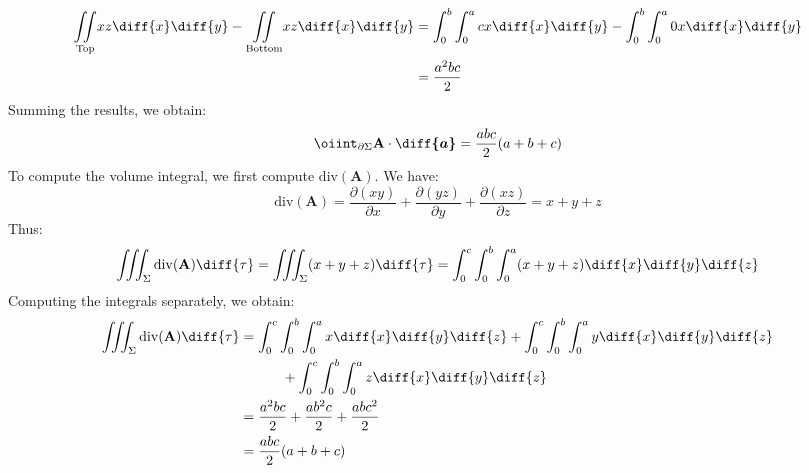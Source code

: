 \begin{solution}
\begin{subequations}
\begin{align}
                        \underset{\textrm{Top}}{\iint}
                            xz\diff{x}\diff{y}-
                        \underset{\textrm{Bottom}}{\iint}
                            xz\diff{x}\diff{y}
                        &=\int_{0}^{b}\int_{0}^{a}cx\diff{x}\diff{y}-
                          \int_{0}^{b}\int_{0}^{a}0x\diff{x}\diff{y}\\
                        &=\frac{a^{2}bc}{2}
                    \end{align}
                \end{subequations}
                Summing the results, we obtain:
                \begin{equation}
                    \oiint_{\partial\Sigma}
                        \mathbf{A}\cdot\boldsymbol{\diff{a}}
                    =\frac{abc}{2}(a+b+c)
                \end{equation}
                To compute the volume integral, we first compute
                $\mathrm{div}(\mathbf{A})$. We have:
                \begin{equation}
                    \mathrm{div}(\mathbf{A})
                    =\frac{\partial(xy)}{\partial{x}}
                    +\frac{\partial(yz)}{\partial{y}}
                    +\frac{\partial(xz)}{\partial{z}}
                    =x+y+z
                \end{equation}
                Thus:
                \begin{equation}
                    \iiint_{\Sigma}\mathrm{div}(\mathbf{A})\diff{\tau}
                    =\iiint_{\Sigma}(x+y+z)\diff{\tau}
                    =\int_{0}^{c}\int_{0}^{b}\int_{0}^{a}
                        (x+y+z)\diff{x}\diff{y}\diff{z}
                \end{equation}
                Computing the integrals separately, we obtain:
                \begin{subequations}
                    \begin{align}
                        \nonumber\iiint_{\Sigma}
                            \mathrm{div}(\mathbf{A})\diff{\tau}
                        &=\int_{0}^{c}\int_{0}^{b}\int_{0}^{a}
                            x\diff{x}\diff{y}\diff{z}+
                        \int_{0}^{c}\int_{0}^{b}\int_{0}^{a}
                            y\diff{x}\diff{y}\diff{z}\\
                        &\quad\quad\quad
                        +\int_{0}^{c}\int_{0}^{b}\int_{0}^{a}
                            z\diff{x}\diff{y}\diff{z}\\
                        &=\frac{a^{2}bc}{2}
                         +\frac{ab^{2}c}{2}
                         +\frac{abc^{2}}{2}\\
                        &=\frac{abc}{2}(a+b+c)
                    \end{align}
                \end{subequations}
            \end{solution}
